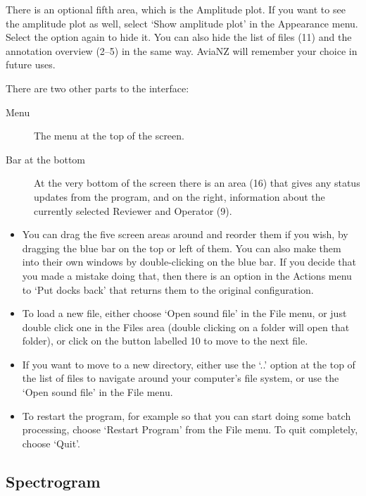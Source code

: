 \documentclass{article}
\begin{document}
There is an optional fifth area, which is the Amplitude plot. If you want to see the amplitude plot as well, select `Show amplitude plot' in the Appearance menu. Select the option again to hide it. You can also hide the list of files (11) and the annotation overview (2--5) in the same way. AviaNZ will remember your choice in future uses.

There are two other parts to the interface:
	\begin{description}
	\item[Menu] The menu at the top of the screen. 
	\item[Bar at the bottom] At the very bottom of the screen there is an area (16) that gives any status updates from the program, and on the right, information about the currently selected Reviewer and Operator (9).
	\end{description}

\begin{itemize}
\item You can drag the five screen areas around and reorder them if you wish, by dragging the blue bar on the top or left of them. You can also make them into their own windows by double-clicking on the blue bar. If you decide that you made a mistake doing that, then there is an option in the Actions menu to `Put docks back' that returns them to the original configuration.

\item To load a new file, either choose `Open sound file' in the File menu, or just double click one in the Files area (double clicking on a folder will open that folder), or click on the button labelled 10 to move to the next file.

\item If you want to move to a new directory, either use the `..' option at the top of the list of files to navigate around your computer's file system, or use the  `Open sound file' in the File menu.

\item To restart the program, for example so that you can start doing some batch processing, choose `Restart Program' from the File menu. To quit completely, choose `Quit'. 
\end{itemize}

\subsection{Spectrogram}\label{sec:spectrogram}
\end{document}
